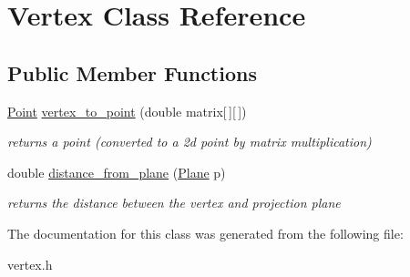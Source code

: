 \hypertarget{class_vertex}{}\section{Vertex Class Reference}
\label{class_vertex}
\subsection*{Public Member Functions}
\begin{DoxyCompactItemize}
\item 
\mbox{\label{class_vertex_a55f3831f53c7150836532563ad30da1b}} 
\mbox{\hyperlink{class_point}{Point}} \mbox{\hyperlink{class_vertex_a55f3831f53c7150836532563ad30da1b}{vertex\+\_\+to\+\_\+point}} (double matrix\mbox{[}$\,$\mbox{]}\mbox{[}$\,$\mbox{]})
\begin{DoxyCompactList}\small\item\em returns a point (converted to a 2d point by matrix multiplication) \end{DoxyCompactList}\item 
\mbox{\label{class_vertex_ab5d8d8a3015202cdbce749b57f4ef917}} 
double \mbox{\hyperlink{class_vertex_ab5d8d8a3015202cdbce749b57f4ef917}{distance\+\_\+from\+\_\+plane}} (\mbox{\hyperlink{class_plane}{Plane}} p)
\begin{DoxyCompactList}\small\item\em returns the distance between the vertex and projection plane \end{DoxyCompactList}\end{DoxyCompactItemize}


The documentation for this class was generated from the following file\+:\begin{DoxyCompactItemize}
\item 
vertex.\+h\end{DoxyCompactItemize}
